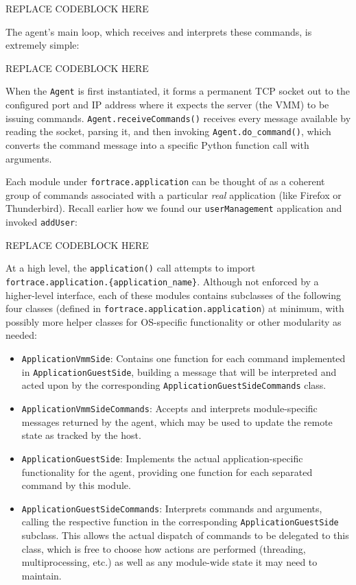 \documentclass[letterpaper,12pt]{report}
\def\tightlist{}
\begin{document}
REPLACE CODEBLOCK HERE

The agent's main loop, which receives and interprets these commands, is
extremely simple:

REPLACE CODEBLOCK HERE

When the \texttt{Agent} is first instantiated, it forms a permanent TCP
socket out to the configured port and IP address where it expects the
server (the VMM) to be issuing commands.
\texttt{Agent.receiveCommands()} receives every message available by
reading the socket, parsing it, and then invoking
\texttt{Agent.do\_command()}, which converts the command message into a
specific Python function call with arguments.

Each module under \texttt{fortrace.application} can be thought of as a
coherent group of commands associated with a particular \emph{real}
application (like Firefox or Thunderbird). Recall earlier how we found
our \texttt{userManagement} application and invoked \texttt{addUser}:

REPLACE CODEBLOCK HERE

At a high level, the \texttt{application()} call attempts to import
\texttt{fortrace.application.\{application\_name\}}. Although not
enforced by a higher-level interface, each of these modules contains
subclasses of the following four classes (defined in
\texttt{fortrace.application.application}) at minimum, with possibly
more helper classes for OS-specific functionality or other modularity as
needed:

\begin{itemize}
\tightlist
\item
  \texttt{ApplicationVmmSide}: Contains one function for each command
  implemented in \texttt{ApplicationGuestSide}, building a message that
  will be interpreted and acted upon by the corresponding
  \texttt{ApplicationGuestSideCommands} class.
\item
  \texttt{ApplicationVmmSideCommands}: Accepts and interprets
  module-specific messages returned by the agent, which may be used to
  update the remote state as tracked by the host.
\item
  \texttt{ApplicationGuestSide}: Implements the actual
  application-specific functionality for the agent, providing one
  function for each separated command by this module.
\item
  \texttt{ApplicationGuestSideCommands}: Interprets commands and
  arguments, calling the respective function in the corresponding
  \texttt{ApplicationGuestSide} subclass. This allows the actual
  dispatch of commands to be delegated to this class, which is free to
  choose how actions are performed (threading, multiprocessing, etc.) as
  well as any module-wide state it may need to maintain.
\end{itemize}
\end{document}
